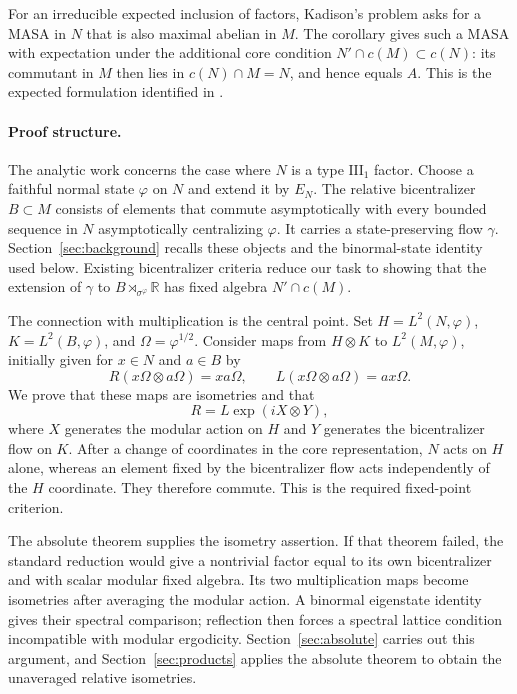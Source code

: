 \documentclass[11pt]{article}
\theoremstyle{definition}
\newcommand{\R}{\mathbb R}
\begin{document}
For an irreducible expected inclusion of factors, Kadison's problem asks
for a MASA in $N$ that is also maximal abelian in $M$. The corollary gives
such a MASA with expectation under the additional core condition
$N'\cap c(M)\subset c(N)$: its commutant in $M$ then lies in
$c(N)\cap M=N$, and hence equals $A$. This is the expected formulation
identified in \cite[Conjecture~B and the discussion after Theorem~D]{M1}.

\paragraph{Proof structure.}
The analytic work concerns the case where $N$ is a type $\mathrm{III}_1$
factor. Choose a faithful normal state $\varphi$ on $N$ and extend it by
$E_N$. The relative bicentralizer $B\subset M$ consists of elements that
commute asymptotically with every bounded sequence in $N$ asymptotically
centralizing $\varphi$. It carries a state-preserving flow $\gamma$.
Section~\ref{sec:background} recalls these objects and the binormal-state
identity used below. Existing bicentralizer criteria reduce our task to
showing that the extension of $\gamma$ to
$B\rtimes_{\sigma^\varphi}\R$ has fixed algebra $N'\cap c(M)$.

The connection with multiplication is the central point. Set
$H=L^2(N,\varphi)$, $K=L^2(B,\varphi)$, and $\Omega=\varphi^{1/2}$.
Consider maps from $H\otimes K$ to $L^2(M,\varphi)$, initially given for
$x\in N$ and $a\in B$ by
\[
 R(x\Omega\otimes a\Omega)=xa\Omega,\qquad
 L(x\Omega\otimes a\Omega)=ax\Omega.
\]
We prove that these maps are isometries and that
\[
 R=L\exp(iX\otimes Y),
\]
where $X$ generates the modular action on $H$ and $Y$ generates the
bicentralizer flow on $K$. After a change of coordinates in the core
representation, $N$ acts on $H$ alone, whereas an element fixed by the
bicentralizer flow acts independently of the $H$ coordinate. They
therefore commute. This is the required fixed-point criterion.

The absolute theorem supplies the isometry assertion. If that theorem
failed, the standard reduction would give a nontrivial factor equal to its
own bicentralizer and with scalar modular fixed algebra. Its two
multiplication maps become isometries after averaging the modular action. A binormal eigenstate
identity gives their spectral comparison; reflection then forces a
spectral lattice condition incompatible with modular ergodicity.
Section~\ref{sec:absolute} carries out this argument, and
Section~\ref{sec:products} applies the absolute theorem to obtain the
unaveraged relative isometries.
\end{document}

